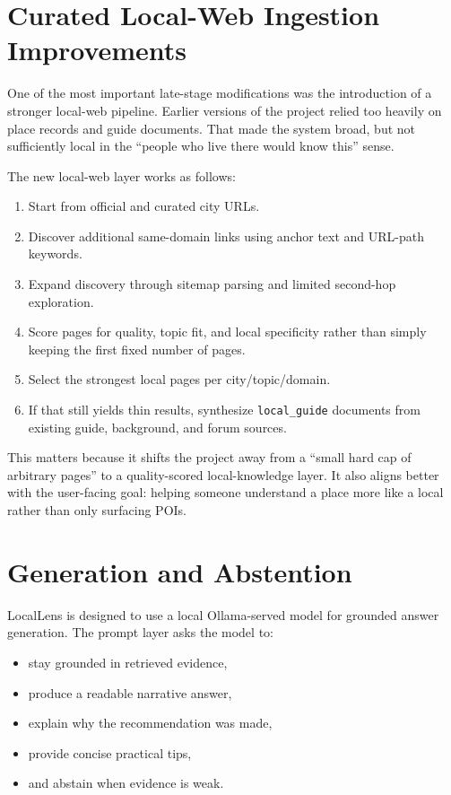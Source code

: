\documentclass[11pt]{article}
\begin{document}
\section{Curated Local-Web Ingestion Improvements}
One of the most important late-stage modifications was the introduction of a stronger local-web pipeline. Earlier versions of the project relied too heavily on place records and guide documents. That made the system broad, but not sufficiently local in the ``people who live there would know this'' sense.

The new local-web layer works as follows:
\begin{enumerate}[leftmargin=*]
    \item Start from official and curated city URLs.
    \item Discover additional same-domain links using anchor text and URL-path keywords.
    \item Expand discovery through sitemap parsing and limited second-hop exploration.
    \item Score pages for quality, topic fit, and local specificity rather than simply keeping the first fixed number of pages.
    \item Select the strongest local pages per city/topic/domain.
    \item If that still yields thin results, synthesize \texttt{local\_guide} documents from existing guide, background, and forum sources.
\end{enumerate}

This matters because it shifts the project away from a ``small hard cap of arbitrary pages'' to a quality-scored local-knowledge layer. It also aligns better with the user-facing goal: helping someone understand a place more like a local rather than only surfacing POIs.

\section{Generation and Abstention}
LocalLens is designed to use a local Ollama-served model for grounded answer generation. The prompt layer asks the model to:
\begin{itemize}[leftmargin=*]
    \item stay grounded in retrieved evidence,
    \item produce a readable narrative answer,
    \item explain why the recommendation was made,
    \item provide concise practical tips,
    \item and abstain when evidence is weak.
\end{itemize}
\end{document}
